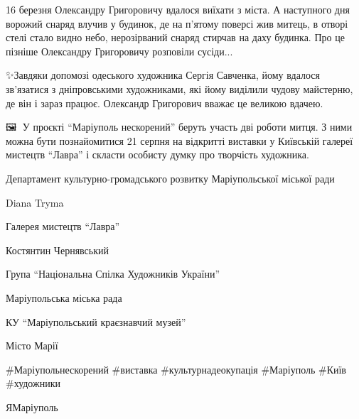 16 березня  Олександру Григоровичу вдалося виїхати з міста. А наступного  дня
ворожий снаряд влучив у будинок, де на п'ятому поверсі  жив митець, в отворі
стелі стало видно небо, нерозірваний снаряд стирчав на даху будинка. Про це
пізніше Олександру Григоровичу розповіли сусіди... 

✨️Завдяки допомозі одеського художника Сергія Савченка, йому вдалося зв’язатися
з дніпровськими художниками, які йому виділили чудову майстерню, де він і зараз
працює. Олександр Григорович вважає це великою вдачею. 

🖼🎨 У проєкті \enquote{Маріуполь нескорений} беруть участь дві роботи митця. З ними
можна бути познайомитися 21 серпня на відкритті виставки у Київській галереї
мистецтв \enquote{Лавра} і скласти особисту думку про творчість художника.

Департамент культурно-громадського розвитку Маріупольської міської ради \par
Diana Tryma \par
Галерея мистецтв \enquote{Лавра} \par
Костянтин Чернявський \par
Група \enquote{Національна Спілка Художників України} \par
Маріупольська міська рада \par
КУ \enquote{Маріупольський краєзнавчий музей} \par
Місто Марії \par
\#Маріупольнескорений \#виставка \#культурнадеокупація \#Маріуполь \#Київ \#художники\par
ЯМаріуполь\par
